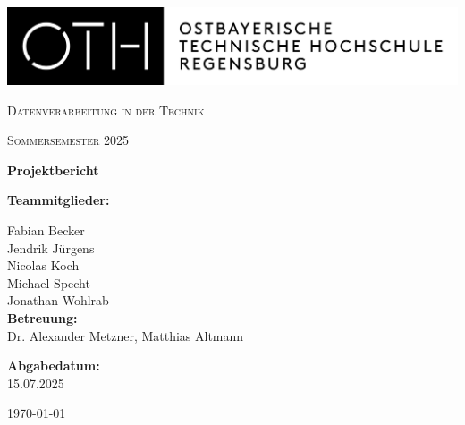 \begin{titlepage}
    \begin{flushleft}
        \includegraphics[width=.6\textwidth]{./images/oth.png}
    \end{flushleft}

    \vspace*{2cm}

    \centering
    {\scshape\Large Datenverarbeitung in der Technik \par}
    \vspace{0.5cm}
    {\scshape Sommersemester 2025 \par}
    \vspace{0.5cm}
    {\huge\bfseries Projektbericht \par}
    \vspace{3cm}

    \begin{flushleft}
        \large
        \textbf{Teammitglieder:} \\
        \vspace{0.5cm}

        Fabian Becker\hfill\makebox[8cm]{\hrulefill} \\[0.5cm]
        Jendrik Jürgens\hfill\makebox[8cm]{\hrulefill} \\[0.5cm]
        Nicolas Koch\hfill\makebox[8cm]{\hrulefill} \\[0.5cm]
        Michael Specht\hfill\makebox[8cm]{\hrulefill} \\[0.5cm]
        Jonathan Wohlrab\hfill\makebox[8cm]{\hrulefill} \\[1cm]

        \textbf{Betreuung:} \\
        Dr. Alexander Metzner, Matthias Altmann \\
        \vspace{0.5cm}

        \textbf{Abgabedatum:} \\
        15.07.2025 \\
    \end{flushleft}

    \vfill
    \centering
    {\large \today\par}
\end{titlepage}
